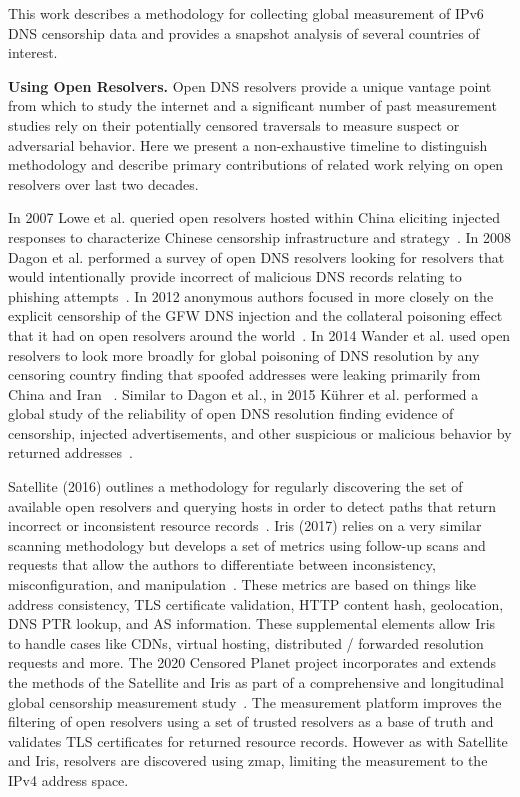 

This work describes a methodology for collecting global measurement of IPv6 DNS
censorship data and provides a snapshot analysis of several countries of interest.

\textbf{Using Open Resolvers.}
Open DNS resolvers provide a unique vantage point from which to study the internet
and a significant number of past measurement studies rely on their potentially censored
traversals to measure suspect or adversarial behavior.  Here we present a
non-exhaustive timeline to distinguish methodology and describe primary
contributions of related work relying on open resolvers over last two decades.

In 2007 Lowe et al. queried open resolvers hosted within China
eliciting injected responses to characterize Chinese censorship infrastructure
and strategy~\cite{lowe2007great}. In 2008 Dagon et al.
performed a survey of open DNS resolvers looking for resolvers that would
intentionally provide incorrect of malicious DNS records relating to
phishing attempts~\cite{dagon2008corrupted}.
In 2012 anonymous authors focused in more closely on the explicit censorship of
the GFW DNS injection and the collateral poisoning effect that it had on open
resolvers around the world~\cite{levis2012collateral}. In 2014 Wander et al.
used open resolvers to look more broadly for global poisoning of DNS resolution
by any censoring country finding that spoofed addresses were leaking primarily
from China and Iran ~\cite{wander2014measurement}. Similar to Dagon et al., in 2015
K{\"u}hrer et al. performed a global study of the reliability of open DNS resolution
finding evidence of censorship, injected advertisements, and other suspicious
or malicious behavior by returned addresses~\cite{kuhrer2015going}.

Satellite (2016) outlines a methodology for regularly discovering the set of
available open resolvers and querying hosts in order to detect paths
that return incorrect or inconsistent resource records~\cite{scott2016satellite}.
Iris (2017) relies on a very similar scanning methodology but develops a set of
metrics using follow-up scans and requests that allow the authors to differentiate
between inconsistency, misconfiguration, and manipulation~\cite{pearce2017global}.
These metrics are based
on things like address consistency, TLS certificate validation, HTTP content hash,
geolocation, DNS PTR lookup, and AS information. These supplemental elements
allow Iris to handle cases like CDNs, virtual hosting, distributed / forwarded
resolution requests and more. The 2020 Censored Planet project incorporates
and extends the methods of the Satellite and Iris as part of a comprehensive
and longitudinal global censorship measurement study~\cite{sundara2020censored}.
The measurement platform improves the filtering of open resolvers using a set of
trusted resolvers as a base of truth and validates TLS certificates for returned
resource records. However as with Satellite and Iris, resolvers are discovered
using zmap, limiting the measurement to the IPv4 address space.

